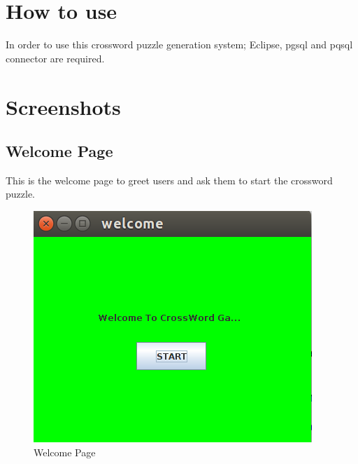 \section{How to use}
In order to use this crossword puzzle generation system; Eclipse, pgsql and pqsql connector are required.


\section{Screenshots}
\subsection{Welcome Page}
This is the welcome page to greet users and ask them to start the crossword puzzle. 
\begin{figure}[!ht]
\centering
\includegraphics[scale=0.6]{first.png}
\caption{\label{img5} Welcome Page}
\end{figure}
\newpage


